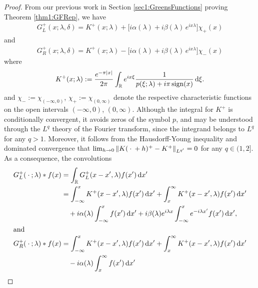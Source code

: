 \documentclass[../dissertation]{subfiles}
\begin{document}
\begin{proof}
	From our previous work in Section 
	\ref{sec1:GreensFunctions} proving Theorem \ref{thm1:GFRep}, we have
	\begin{align}
		G_L^+(x; \lambda, \delta) 
			= 
				K^+(x; \lambda) 
				+ 
					\big[
						i \alpha(\lambda) + i \beta(\lambda)\, e^{ix\lambda} 
					\big] \chi_+(x)
	\end{align}
	and
	\begin{align}
		G_R^+(x; \lambda, \delta) 
			= 
				K^+(x; \lambda) 
				- 
					\big[
						i \alpha(\lambda) + i \beta(\lambda)\, e^{ix\lambda} 
					\big] \chi_-(x)
	\end{align}
	where 
	\begin{align*}
		K^+(x; \lambda) 
				:= \frac{e^{-\pi |x|}}{2\pi} 
					\int_{\mathbb R} e^{i x \xi} 
						\frac{1}{p(\xi; \lambda) + i \pi \sign(x)}
					\, \mathrm{d}\xi.
	\end{align*}
	and $\chi_-:= \chi_{(-\infty, 0)}$, $\chi_+:= \chi_{(0, \infty)}$ denote 
	\label{sym2:chipm}the respective characteristic functions on the open 
	intervals $(-\infty, 0)$, $(0, \infty)$. 
	Although the integral for $K^+$ is conditionally convergent, it avoids 
	zeros of the symbol $p$, and may be understood through the $L^q$ theory 
	of the Fourier transform, since the integrand belongs to $L^q$ for any 
	$q>1$.  Moreover, it follows from the 
	Hausdorf{}f-Young inequality and dominated convergence that 
	$\lim_{h \to 0} \norm[L^{q'}]{K(\dotarg+h)^+ - K^+} =0$ for any $q \in (1,2]$. 
	As a consequence, the convolutions
	\begin{align}
		\label{ILW.GL*f}
		G_L^+(\dotarg; \lambda) * f(x) 	
			&=	\int_{\mathbb R} G_L^+(x-x',\lambda) f(x') \, \mathrm{d}x' 	\\
			&=	
				\int_{-\infty}^x K^+(x-x',\lambda) f(x') \, \mathrm{d}x'
				+\int_x^{\infty} K^+(x-x',\lambda) f(x') \, \mathrm{d}x'
				\nonumber \\
			&\quad 	+ i \alpha (\lambda) \int_{-\infty}^x f(x') \, \mathrm{d}x' 
				+ i \beta(\lambda) e^{i\lam x} 
						\int_{-\infty}^x e^{-i\lambda x'} f(x') \, \mathrm{d}x', 
				\nonumber\\
		\intertext{and}
		\label{ILW.GR*f}
		G_R^+(\dotarg; \lambda) * f(x) 
			&= 
				\int_{-\infty}^x K^+(x-x',\lambda) f(x') \, \mathrm{d}x'
				+\int_x^{\infty} K^+(x-x',\lambda) f(x') \, \mathrm{d}x'
				\\
			&\quad- i \alpha (\lambda) \int_x^{\infty} f(x') \, \mathrm{d}x' 

\end{align}
\end{proof}
\end{document}
